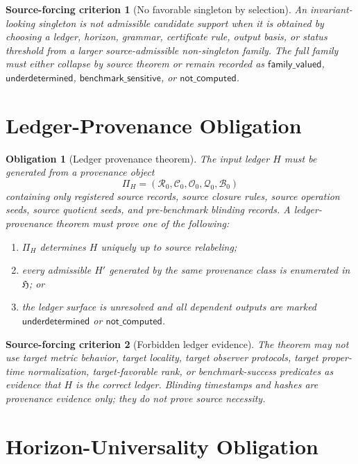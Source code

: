 \documentclass[11pt]{article}
\newcommand{\LedgerFam}{\mathfrak{H}}
\newtheorem{criterion}{Source-forcing criterion}
\newtheorem{obligation}{Obligation}
\begin{document}
\begin{criterion}[No favorable singleton by selection]
An invariant-looking singleton is not admissible candidate support when it is
obtained by choosing a ledger, horizon, grammar, certificate rule, output
basis, or status threshold from a larger source-admissible non-singleton
family. The full family must either collapse by source theorem or remain
recorded as \(\mathsf{family\_valued}\), \(\mathsf{underdetermined}\),
\(\mathsf{benchmark\_sensitive}\), or \(\mathsf{not\_computed}\).
\end{criterion}

\section{Ledger-Provenance Obligation}

\begin{obligation}[Ledger provenance theorem]
The input ledger \(H\) must be generated from a provenance object
\[
\Pi_H=(\mathcal{R}_{0},\mathcal{C}_{0},\mathcal{O}_{0},
\mathcal{Q}_{0},\mathcal{B}_{0})
\]
containing only registered source records, source closure rules, source
operation seeds, source quotient seeds, and pre-benchmark blinding records.
A ledger-provenance theorem must prove one of the following:
\begin{enumerate}
    \item \(\Pi_H\) determines \(H\) uniquely up to source relabeling;
    \item every admissible \(H'\) generated by the same provenance class is
    enumerated in \(\LedgerFam\); or
    \item the ledger surface is unresolved and all dependent outputs are
    marked \(\mathsf{underdetermined}\) or \(\mathsf{not\_computed}\).
\end{enumerate}
\end{obligation}

\begin{criterion}[Forbidden ledger evidence]
The theorem may not use target metric behavior, target locality, target
observer protocols, target proper-time normalization, target-favorable rank,
or benchmark-success predicates as evidence that \(H\) is the correct ledger.
Blinding timestamps and hashes are provenance evidence only; they do not
prove source necessity.
\end{criterion}

\section{Horizon-Universality Obligation}
\end{document}
